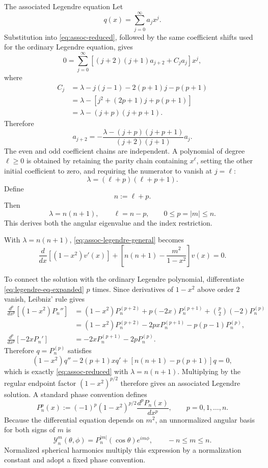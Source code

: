 \documentclass[11pt]{beamer}
\begin{document}
\begin{frame}[allowframebreaks]{The associated Legendre equation}
Let
\[
  q(x)=\sum_{j=0}^{\infty}a_jx^j.
\]
Substitution into \eqref{eq:assoc-reduced}, followed by the same coefficient
shifts used for the ordinary Legendre equation, gives
\[
  0
   =
  \sum_{j=0}^{\infty}
  \left[
    (j+2)(j+1)a_{j+2}+C_j a_j
  \right]x^j,
\]
where
\begin{align*}
  C_j
   &=
    \lambda-j(j-1)-2(p+1)j-p(p+1)\\
   &=
    \lambda-\left[j^2+(2p+1)j+p(p+1)\right]\\
   &=
    \lambda-(j+p)(j+p+1).
\end{align*}
Therefore
\begin{equation}
  a_{j+2}
   =
  -\frac{\lambda-(j+p)(j+p+1)}
         {(j+2)(j+1)}a_j.
  \label{eq:assoc-coeff-recurrence}
\end{equation}
The even and odd coefficient chains are independent.  A polynomial of degree
$\ell\ge0$ is obtained by retaining the parity chain containing $x^\ell$,
setting the other initial coefficient to zero, and requiring the numerator to
vanish at $j=\ell$:
\[
  \lambda=(\ell+p)(\ell+p+1).
\]
Define
\[
  n:=\ell+p.
\]
Then
\[
  \lambda=n(n+1),
  \qquad
  \ell=n-p,
  \qquad
  0\le p=|m|\le n.
\]
This derives both the angular eigenvalue and the index restriction.

With $\lambda=n(n+1)$, \eqref{eq:assoc-legendre-general} becomes
\begin{equation}
  \frac{d}{dx}\left[(1-x^2)v'(x)\right]
  +\left[
      n(n+1)-\frac{m^2}{1-x^2}
   \right]v(x)=0.
  \label{eq:assoc-legendre}
\end{equation}

To connect the solution with the ordinary Legendre polynomial, differentiate
\eqref{eq:legendre-eq-expanded} $p$ times.  Since derivatives of
$1-x^2$ above order $2$ vanish, Leibniz' rule gives
\begin{align*}
  \frac{d^p}{dx^p}\left[(1-x^2)P_n''\right]
   &=
    (1-x^2)P_n^{(p+2)}
    +p(-2x)P_n^{(p+1)}
    +\binom{p}{2}(-2)P_n^{(p)}\\
   &=
    (1-x^2)P_n^{(p+2)}
    -2pxP_n^{(p+1)}
    -p(p-1)P_n^{(p)},\\
  \frac{d^p}{dx^p}\left[-2xP_n'\right]
   &=
    -2xP_n^{(p+1)}-2pP_n^{(p)}.
\end{align*}
Therefore $q=P_n^{(p)}$ satisfies
\[
  (1-x^2)q''-2(p+1)xq'
  +\left[n(n+1)-p(p+1)\right]q=0,
\]
which is exactly \eqref{eq:assoc-reduced} with $\lambda=n(n+1)$.  Multiplying
by the regular endpoint factor $(1-x^2)^{p/2}$ therefore gives an associated
Legendre solution.  A standard phase convention defines
\begin{equation}
  P_n^p(x)
    :=(-1)^p(1-x^2)^{p/2}
      \frac{d^pP_n(x)}{dx^p},
  \qquad p=0,1,\ldots,n.
  \label{eq:associated-legendre-definition}
\end{equation}
Because the differential equation depends on $m^2$, an unnormalized angular
basis for both signs of $m$ is
\[
  \mathcal Y_n^m(\theta,\phi)
    =P_n^{|m|}(\cos\theta)e^{im\phi},
  \qquad -n\le m\le n.
\]
Normalized spherical harmonics multiply this expression by a normalization
constant and adopt a fixed phase convention.


\end{frame}
\end{document}
